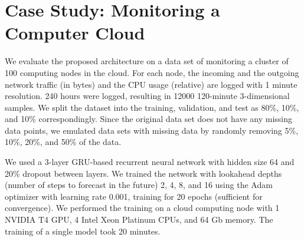 \documentclass[runningheads]{llncs}
\begin{document}
\section{Case Study: Monitoring a Computer Cloud}

We evaluate the proposed architecture on a data set of
monitoring a cluster of 100 computing nodes in the cloud. For
each node, the incoming and the outgoing network traffic (in
bytes) and the CPU usage (relative) are logged with 1 minute
resolution. 240 hours were logged, resulting in 12000 120-minute
3-dimensional samples.  We split the dataset into the training,
validation, and test as 80\%, 10\%, and 10\% correspondingly.
Since the original data set does not have any missing data
points, we emulated data sets with missing data by randomly
removing 5\%, 10\%, 20\%, and 50\% of the data.

We used a 3-layer GRU-based recurrent neural network with hidden
size 64 and 20\% dropout between layers. We trained the network
with lookahead depths (number of steps to forecast in the
future) 2, 4, 8, and 16 using the Adam optimizer with learning
rate 0.001, training for 20 epochs (sufficient for convergence).
We performed the training on a cloud computing node with 1
NVIDIA T4 GPU, 4 Intel Xeon Platinum CPUs, and 64 Gb memory. The
training of a single model took 20 minutes.
\end{document}
